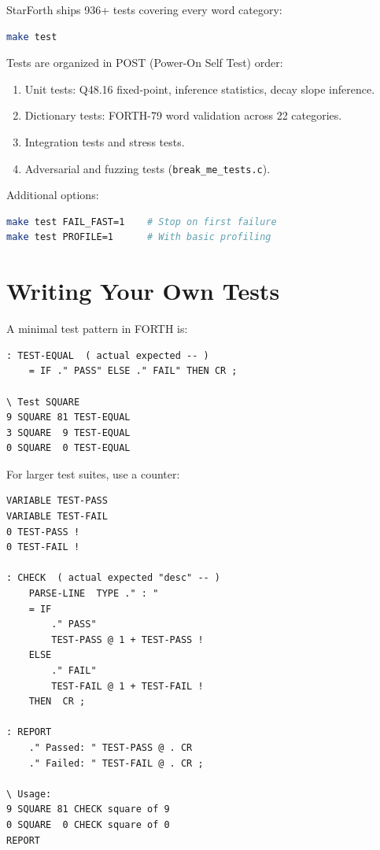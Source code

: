 StarForth ships 936+ tests covering every word category:

\begin{lstlisting}[language=bash]
make test
\end{lstlisting}

Tests are organized in POST (Power-On Self Test) order:

\begin{enumerate}
  \item Unit tests: Q48.16 fixed-point, inference statistics, decay slope
    inference.
  \item Dictionary tests: FORTH-79 word validation across 22 categories.
  \item Integration tests and stress tests.
  \item Adversarial and fuzzing tests (\texttt{break\_me\_tests.c}).
\end{enumerate}

Additional options:

\begin{lstlisting}[language=bash]
make test FAIL_FAST=1    # Stop on first failure
make test PROFILE=1      # With basic profiling
\end{lstlisting}

\section{Writing Your Own Tests}
\label{sec:writing-tests}

A minimal test pattern in FORTH is:

\begin{lstlisting}[language=Forth]
: TEST-EQUAL  ( actual expected -- )
    = IF ." PASS" ELSE ." FAIL" THEN CR ;

\ Test SQUARE
9 SQUARE 81 TEST-EQUAL
3 SQUARE  9 TEST-EQUAL
0 SQUARE  0 TEST-EQUAL
\end{lstlisting}

For larger test suites, use a counter:

\begin{lstlisting}[language=Forth]
VARIABLE TEST-PASS
VARIABLE TEST-FAIL
0 TEST-PASS !
0 TEST-FAIL !

: CHECK  ( actual expected "desc" -- )
    PARSE-LINE  TYPE ." : "
    = IF
        ." PASS"
        TEST-PASS @ 1 + TEST-PASS !
    ELSE
        ." FAIL"
        TEST-FAIL @ 1 + TEST-FAIL !
    THEN  CR ;

: REPORT
    ." Passed: " TEST-PASS @ . CR
    ." Failed: " TEST-FAIL @ . CR ;

\ Usage:
9 SQUARE 81 CHECK square of 9
0 SQUARE  0 CHECK square of 0
REPORT
\end{lstlisting}
